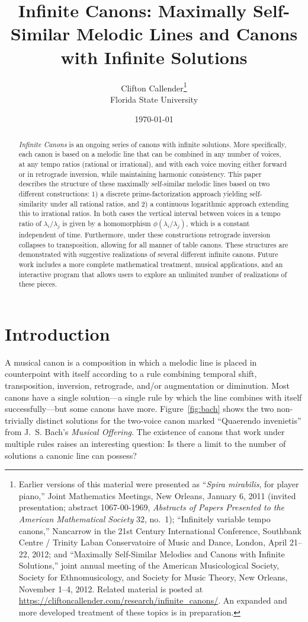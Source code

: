 \documentclass[11pt]{article}
\title{Infinite Canons: Maximally Self-Similar Melodic Lines and Canons with Infinite Solutions}
\author{Clifton Callender\thanks{Earlier versions of this material were presented as ``\emph{Spira mirabilis}, for player piano,'' Joint Mathematics Meetings, New Orleans, January 6, 2011 (invited presentation; abstract 1067-00-1969, \emph{Abstracts of Papers Presented to the American Mathematical Society} 32, no.~1); ``Infinitely variable tempo canons,'' Nancarrow in the
21st Century International Conference, Southbank Centre / Trinity Laban Conservatoire of Music and Dance, London, April 21--22, 2012; and ``Maximally Self-Similar Melodies and Canons with Infinite Solutions,'' joint annual meeting of the American Musicological Society, Society for Ethnomusicology, and Society for Music Theory, New Orleans, November 1--4, 2012. Related material is posted at \url{https://cliftoncallender.com/research/infinite_canons/}. An expanded and more developed treatment of these topics is in preparation.}\\
\small Florida State University}
\date{\today}
\theoremstyle{plain}
\theoremstyle{definition}
\theoremstyle{remark}
\begin{document}
\maketitle

\begin{abstract}
\textit{Infinite Canons} is an ongoing series of canons with infinite solutions. More specifically, each canon is based on a melodic line that can be combined in any number of voices, at any tempo ratios (rational or irrational), and with each voice moving either forward or in retrograde inversion, while maintaining harmonic consistency. This paper describes the structure of these maximally self-similar melodic lines based on two different constructions: 1) a discrete prime-factorization approach yielding self-similarity under all rational ratios, and 2) a continuous logarithmic approach extending this to irrational ratios. In both cases the vertical interval between voices in a tempo ratio of $\lambda_i / \lambda_j$ is given by a homomorphism $\phi(\lambda_i / \lambda_j)$, which is a constant independent of time. Furthermore, under these constructions retrograde inversion collapses to transposition, allowing for all manner of table canons. These structures are demonstrated with suggestive realizations of several different infinite canons. Future work includes a more complete mathematical treatment, musical applications, and an interactive program that allows users to explore an unlimited number of realizations of these pieces.
\end{abstract}


\section{Introduction}
\label{sec:intro}

A musical canon is a composition in which a melodic line is placed in counterpoint with itself according to a rule combining temporal shift, transposition, inversion, retrograde, and/or augmentation or diminution. Most canons have a single solution---a single rule by which the line combines with itself successfully---but some canons have more. Figure~\ref{fig:bach} shows
the two non-trivially distinct solutions for the two-voice canon marked ``Quaerendo invenietis'' from J.~S. Bach's \emph{Musical Offering}. The existence of canons that work under multiple rules raises an interesting question: Is there a limit to the number of solutions a canonic line can possess?
\end{document}
